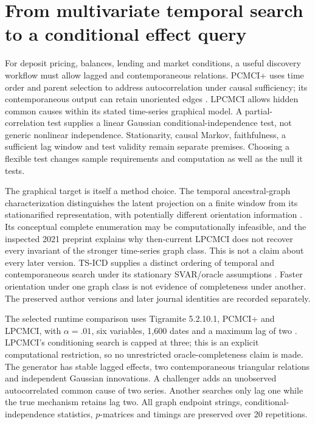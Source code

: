 \section{From multivariate temporal search to a conditional effect query}
\label{s5:discovery}
For deposit pricing, balances, lending and market conditions, a useful
discovery workflow must allow lagged and contemporaneous relations. PCMCI+
uses time order and parent selection to address autocorrelation under causal
sufficiency; its contemporaneous output can retain unoriented edges
\citep{runge2020}. LPCMCI allows hidden common causes within its stated
time-series graphical model. A partial-correlation test supplies a linear
Gaussian conditional-independence test, not generic nonlinear independence.
Stationarity, causal Markov, faithfulness, a sufficient lag window and test
validity remain separate premises. Choosing a flexible test changes sample
requirements and computation as well as the null it tests.

The graphical target is itself a method choice. The temporal ancestral-graph
characterization distinguishes the latent projection on a finite window from
its stationarified representation, with potentially different orientation
information \citep[Sections 4.5--4.6 and Propositions 5.2--5.7]{gerhardus2021}.
Its conceptual complete enumeration may be computationally infeasible, and
the inspected 2021 preprint explains why then-current LPCMCI does not recover
every invariant of the stronger time-series graph class. This is not a
claim about every later version. TS-ICD supplies a distinct ordering of
temporal and contemporaneous search under its stationary SVAR/oracle
assumptions \citep{rohekar2023}. Faster orientation under one graph class
is not evidence of completeness under another. The preserved author versions
and later journal identities are recorded separately.

The selected runtime comparison uses Tigramite 5.2.10.1, PCMCI+ and LPCMCI,
with $\alpha=.01$, six variables, 1,600 dates and a maximum lag of two
\citep{runtime_tigramite_scope}. LPCMCI's conditioning search is capped at
three; this is an explicit computational restriction, so no unrestricted
oracle-completeness claim is made. The generator has stable lagged effects,
two contemporaneous triangular relations and independent Gaussian
innovations. A challenger adds an unobserved autocorrelated common cause
of two series. Another searches only lag one while the true mechanism
retains lag two. All graph endpoint strings, conditional-independence
statistics, $p$-matrices and timings are preserved over 20 repetitions.

